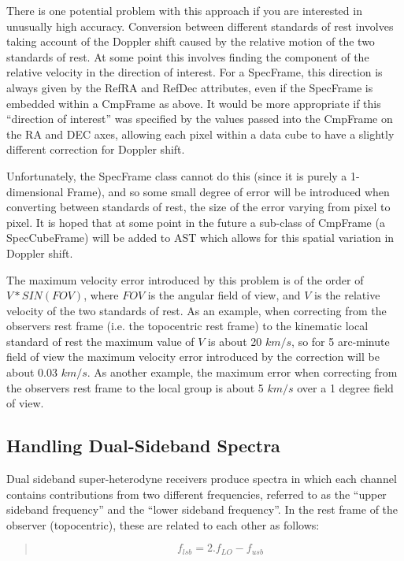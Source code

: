\documentclass[twoside,11pt]{article}
\begin{document}
There is one potential problem with this approach if you are interested in
unusually high accuracy. Conversion between different standards of rest
involves taking account of the Doppler shift caused by the relative
motion of the two standards of rest. At some point this involves finding
the component of  the relative velocity in the direction of interest.
For a SpecFrame, this direction is always given by the RefRA and RefDec
attributes, even if the SpecFrame is embedded within a CmpFrame as above.
It would be more appropriate if this ``direction of interest'' was
specified by the values passed into the CmpFrame on the RA and DEC axes,
allowing each pixel within a data cube to have a slightly different
correction for Doppler shift.

Unfortunately, the SpecFrame class cannot do this (since it is purely a
1-dimensional Frame), and so some small degree of error will be
introduced when converting between standards of rest, the size of the
error varying from pixel to pixel. It is hoped that at some point in the
future a sub-class of CmpFrame (a SpecCubeFrame) will be added to AST which 
allows for this spatial variation in Doppler shift.

The maximum velocity error introduced by this problem is of the order of
$V*SIN(FOV)$, where $FOV$ is the angular field of view, and $V$ is the
relative velocity of the two standards of rest. As an example, when
correcting from the observers rest frame (i.e. the topocentric rest
frame) to the kinematic local standard of rest the maximum value of $V$
is about 20 $km/s$, so for 5 arc-minute field of view the maximum
velocity error introduced by the correction will be about 0.03 $km/s$. As
another example, the maximum error when correcting from the observers
rest frame to the local group is about 5 $km/s$ over a 1 degree field of
view.

\subsection{\label{ss:handlingdualsidebandspectra}Handling Dual-Sideband Spectra}
Dual sideband super-heterodyne receivers produce spectra in which each channel
contains contributions from two different frequencies, referred to as the
``upper sideband frequency'' and the ``lower sideband frequency''. In the
rest frame of the observer (topocentric), these are related to each other as 
follows:

\begin{quote}
\begin{small}
\begin{equation}
\label{eqn:dsb}
   f_{lsb} = 2.f_{LO} - f_{usb}
\end{equation}
\end{small}
\end{quote}
\end{document}
